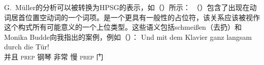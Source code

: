 \begin{exe}
\begin{xlist}[iv.]
\begin{exe}
\begin{xlist}[iv.]
G.\ Müller的分析可以被转换为HPSG的表示，如（）所示：
\ea
{}
\z
（）包含了出现在动词居首位置空动词的一个词项。是一个更具有一般性的占位符，该关系应该被视作这个构式所有可能意义的一个上位类型。这些语义包括schmeißen（去扔）和Monika Budde向我指出的案例，例如（）：
\ea
\label{Klavier-durch-die-Tuer}
\gll Und mit dem Klavier ganz langsam durch die Tür!\\
	 并且 \textsc{prep}  钢琴 非常 慢 \textsc{prep}  门\\

\end{xlist}
\end{exe}
\end{xlist}
\end{exe}
